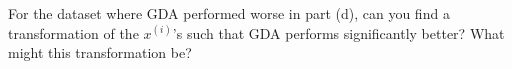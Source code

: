 \item {} For the dataset where GDA performed worse in
part (d), can you find a transformation of the $x^{(i)}$'s such
that GDA performs significantly better? What might this transformation be?

